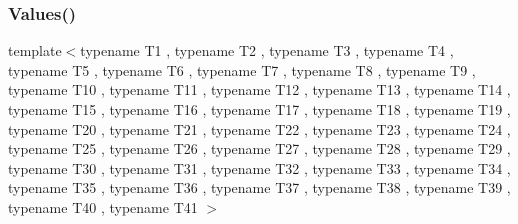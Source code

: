\mbox{\label{namespacetesting_a51df725741cfcc9539c48885fc2728b0}} 
\subsubsection{\texorpdfstring{Values()}{Values()}\hspace{0.1cm}{\footnotesize\ttfamily [41/50]}}
{\footnotesize\ttfamily template$<$typename T1 , typename T2 , typename T3 , typename T4 , typename T5 , typename T6 , typename T7 , typename T8 , typename T9 , typename T10 , typename T11 , typename T12 , typename T13 , typename T14 , typename T15 , typename T16 , typename T17 , typename T18 , typename T19 , typename T20 , typename T21 , typename T22 , typename T23 , typename T24 , typename T25 , typename T26 , typename T27 , typename T28 , typename T29 , typename T30 , typename T31 , typename T32 , typename T33 , typename T34 , typename T35 , typename T36 , typename T37 , typename T38 , typename T39 , typename T40 , typename T41 $>$ \\
}
